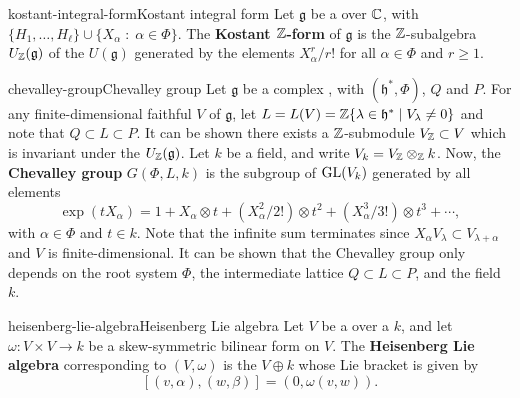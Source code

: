 \begin{topic}{kostant-integral-form}{Kostant integral form}
    Let $\mathfrak{g}$ be a   over $\mathbb{C}$, with  $\{ H_1, \ldots, H_\ell \} \cup \{ X_\alpha \;:\; \alpha \in \Phi \}$. The \textbf{Kostant $\mathbb{Z}$-form} of $\mathfrak{g}$ is the $\mathbb{Z}$-subalgebra $U_{\mathbb{Z}}(\mathfrak{g})$ of the  $U(\mathfrak{g})$ generated by the elements $X_\alpha^r / r!$ for all $\alpha \in \Phi$ and $r \ge 1$.
\end{topic}

\begin{topic}{chevalley-group}{Chevalley group}
    Let $\mathfrak{g}$ be a  complex , with  $(\mathfrak{h}^*, \Phi)$,  $Q$ and  $P$. For any finite-dimensional faithful  $V$ of $\mathfrak{g}$, let $L = L(V) = \mathbb{Z} \{ \lambda \in \mathfrak{h}^* \mid V_\lambda \ne 0 \}$ and note that $Q \subset L \subset P$. It can be shown there exists a $\mathbb{Z}$-submodule $V_{\mathbb{Z}} \subset V$ which is invariant under the  $U_{\mathbb{Z}}(\mathfrak{g})$. Let $k$ be a field, and write $V_k = V_{\mathbb{Z}} \otimes_{\mathbb{Z}} k$. Now, the \textbf{Chevalley group} $G(\Phi, L, k)$ is the subgroup of $\textup{GL}(V_k)$ generated by all elements
    \[ \exp(t X_\alpha) = 1 + X_\alpha \otimes t + (X_\alpha^2 / 2!) \otimes t^2 + (X_\alpha^3 / 3!) \otimes t^3 + \cdots , \]
    with $\alpha \in \Phi$ and $t \in k$. Note that the infinite sum terminates since $X_\alpha V_\lambda \subset V_{\lambda + \alpha}$ and $V$ is finite-dimensional. It can be shown that the Chevalley group only depends on the root system $\Phi$, the intermediate lattice $Q \subset L \subset P$, and the field $k$.
\end{topic}



\begin{topic}{heisenberg-lie-algebra}{Heisenberg Lie algebra}
    Let $V$ be a  over a  $k$, and let $\omega \colon V \times V \to k$ be a skew-symmetric bilinear form on $V$. The \textbf{Heisenberg Lie algebra} corresponding to $(V, \omega)$ is the  $V \oplus k$ whose Lie bracket is given by
    \[ [ (v, \alpha), (w, \beta) ] = (0, \omega(v, w)) . \]
\end{topic}

